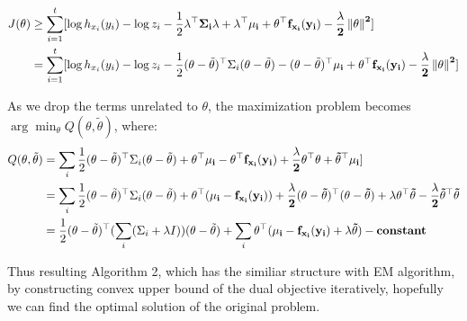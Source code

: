 \documentclass{article}
\begin{document}
 \begin{equation}
  \begin{aligned}
   J(\theta ) & \geq \sum_{i=1}^{t} [\log h_{x_i}(y_i) - \log z_i  - \frac{1}{2} \bf{\lambda}^{\top} \Sigma_i \bf{\lambda} + \bf{\lambda}^{\top} \bf{\mu}_i + \theta^{\top} \textbf{f}_{x_i}(y_i) - \frac{\lambda}{2} \left\lVert \theta \right\lVert^2 ]    \\
 & = \sum_{i=1}^{t} [\log h_{x_i}(y_i) - \log z_i  - \frac{1}{2} (\theta - \tilde{\theta})^{\top} \Sigma_i (\theta - \tilde{\theta}) - (\theta - \tilde{\theta})^{\top} \bf{\mu}_i + \theta^{\top} \textbf{f}_{x_i}(y_i) - \frac{\lambda}{2} \left\lVert \theta \right\lVert^2 ] \\
 \end{aligned}
 \end{equation} 

As we drop the terms unrelated to $\theta$, the maximization problem becomes $\arg \min_{\theta} Q(\theta, \tilde{\theta})$, where:
\begin{equation}
  \begin{aligned}
    Q(\theta, \tilde{\theta}) &= \sum_i \frac{1}{2} (\theta - \tilde{\theta})^{\top}  \Sigma_i (\theta - \tilde{\theta}) + \theta ^{\top} \bf{\mu}_i - \theta^{\top} \textbf{f}_{x_i}(y_i) + \frac{\lambda}{2} \theta^{\top}\theta + \tilde{\theta}^{\top} \mu_i  ]   \\
  & = \sum_i \frac{1}{2} (\theta - \tilde{\theta})^{\top} \Sigma_i (\theta - \tilde{\theta}) +  \theta ^{\top} (\bf{\mu}_i - \textbf{f}_{x_i}(y_i)) + \frac{\lambda}{2} (\theta- \tilde{\theta})^{\top}(\theta- \tilde{\theta}) + \lambda\theta^{\top}\tilde{\theta} - \frac{\lambda}{2} \tilde{\theta}^{\top}\tilde{\theta} \\
 & =  \frac{1}{2} (\theta - \tilde{\theta})^{\top} (\sum_i (\Sigma_i + \lambda I) )(\theta - \tilde{\theta}) + \sum_i \theta ^{\top} (\bf{\mu}_i - \textbf{f}_{x_i}(y_i)+ \lambda \tilde{\theta}) - constant
\end{aligned}
 \end{equation} 

Thus resulting Algorithm 2, which has the similiar structure with EM algorithm, by constructing convex upper bound of the dual objective iteratively, hopefully we can
find the optimal solution of the original problem.
\end{document}
